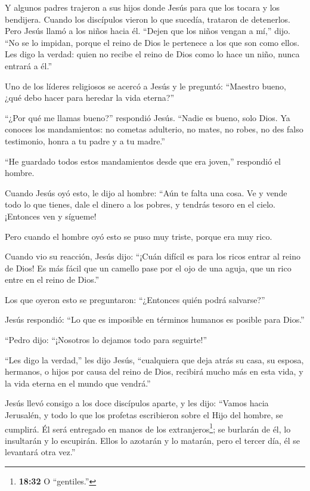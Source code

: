  Y algunos padres trajeron a sus hijos donde Jesús para que
los tocara y los bendijera. Cuando los discípulos vieron lo que sucedía,
trataron de detenerlos.  Pero Jesús llamó a los niños hacia
él. ``Dejen que los niños vengan a mí,'' dijo. ``No se lo impidan,
porque el reino de Dios le pertenece a los que son como ellos.
 Les digo la verdad: quien no recibe el reino de Dios como
lo hace un niño, nunca entrará a él.''

 Uno de los líderes religiosos se acercó a Jesús y le
preguntó: ``Maestro bueno, ¿qué debo hacer para heredar la vida
eterna?''

 ``¿Por qué me llamas bueno?'' respondió Jesús. ``Nadie es
bueno, solo Dios.  Ya conoces los mandamientos: no cometas
adulterio, no mates, no robes, no des falso testimonio, honra a tu padre
y a tu madre.''

 ``He guardado todos estos mandamientos desde que era
joven,'' respondió el hombre.

 Cuando Jesús oyó esto, le dijo al hombre: ``Aún te falta
una cosa. Ve y vende todo lo que tienes, dale el dinero a los pobres, y
tendrás tesoro en el cielo. ¡Entonces ven y sígueme!

 Pero cuando el hombre oyó esto se puso muy triste, porque
era muy rico.

 Cuando vio su reacción, Jesús dijo: ``¡Cuán difícil es
para los ricos entrar al reino de Dios!  Es más fácil que
un camello pase por el ojo de una aguja, que un rico entre en el reino
de Dios.''

 Los que oyeron esto se preguntaron: ``¿Entonces quién
podrá salvarse?''

 Jesús respondió: ``Lo que es imposible en términos humanos
es posible para Dios.''

 ``Pedro dijo: ``¡Nosotros lo dejamos todo para seguirte!''

 ``Les digo la verdad,'' les dijo Jesús, ``cualquiera que
deja atrás su casa, su esposa, hermanos, o hijos por causa del reino de
Dios,  recibirá mucho más en esta vida, y la vida eterna en
el mundo que vendrá.''

 Jesús llevó consigo a los doce discípulos aparte, y les
dijo: ``Vamos hacia Jerusalén, y todo lo que los profetas escribieron
sobre el Hijo del hombre, se cumplirá.  Él será entregado
en manos de los extranjeros\footnote{\textbf{18:32} O ``gentiles.''}; se
burlarán de él, lo insultarán y lo escupirán.  Ellos lo
azotarán y lo matarán, pero el tercer día, él se levantará otra vez.''

